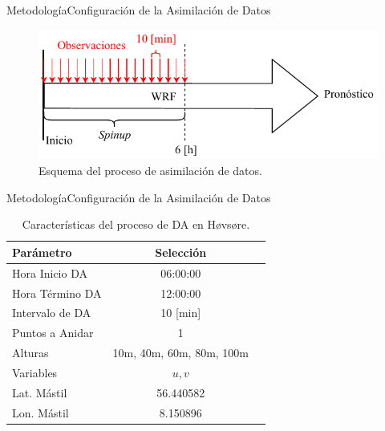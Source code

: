 \documentclass[mathserif,10pt]{beamer}
\begin{document}
\begin{frame}{Metodología}{Configuración de la Asimilación de Datos}
	\begin{figure}[H]
		\centering
		\includegraphics[width=0.95\linewidth,page=1,trim={0cm 0cm 0cm 0cm},clip]{fig/05/da}%
		\caption{Esquema del proceso de asimilación de datos.}
		\label{fig:05_da}
	\end{figure}
\end{frame}

\begin{frame}{Metodología}{Configuración de la Asimilación de Datos}
	\begin{table}[h!]
		\caption{Características del proceso de DA en Høvsøre.}\label{tab:05_config_da_hov}
		\centering\footnotesize
		\begin{tabular}{lcc}
			\toprule
			Parámetro & Selección \\
			\midrule
			Hora Inicio	DA 	 & 06:00:00   \\
			Hora Término DA	 		 & 12:00:00  \\
			Intervalo de DA	&	10 [min] \\
			Puntos a Anidar	 	 & 1   \\
			Alturas 	& 10m, 40m, 60m, 80m, 100m \\
			Variables	& $u,v$   \\
			Lat. Mástil	& 56.440582   \\
			Lon. Mástil	& 8.150896   \\
			
			\bottomrule
		\end{tabular}
	\end{table}
	
	\begin{table}[H]
		\caption{Detalle de la asimilación en cada mástil en Bolund.}\label{tab:05_mast_da_bol}
		\vspace{-4mm}
		\centering\footnotesize{}
		\end{table}
\end{frame}
\end{document}
